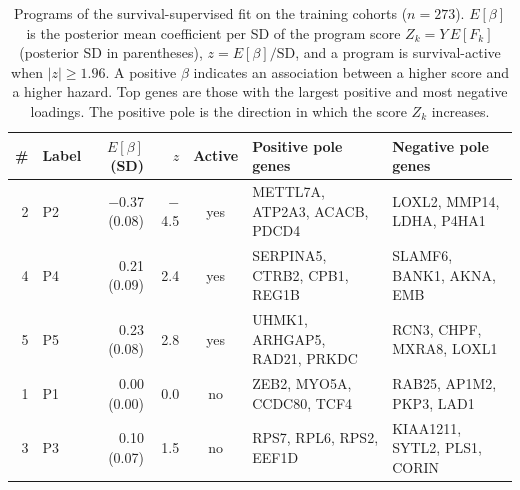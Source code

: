 \begin{table}[tbp]
\centering
\small
\setlength{\tabcolsep}{2.5pt}
\caption{Programs of the survival-supervised fit on the training cohorts ($n=273$). $E[\beta]$ is the posterior mean coefficient per SD of the program score $Z_k = Y\,E[F_k]$ (posterior SD in parentheses), $z = E[\beta]/\mathrm{SD}$, and a program is survival-active when $|z|\ge 1.96$. A positive $\beta$ indicates an association between a higher score and a higher hazard. Top genes are those with the largest positive and most negative loadings. The positive pole is the direction in which the score $Z_k$ increases.}
\label{tab:programs}
\begin{tabular}{@{}r p{1.12in} r r c p{1.3in} p{1.3in}@{}}
\toprule
\# & Label & $E[\beta]$ (SD) & $z$ & Active & Positive pole genes & Negative pole genes \\
\midrule
2 & P2 & $-$0.37 (0.08) & $-$4.5 & yes & METTL7A, ATP2A3, ACACB, PDCD4 & LOXL2, MMP14, LDHA, P4HA1 \\
4 & P4 & 0.21 (0.09) & 2.4 & yes & SERPINA5, CTRB2, CPB1, REG1B & SLAMF6, BANK1, AKNA, EMB \\
5 & P5 & 0.23 (0.08) & 2.8 & yes & UHMK1, ARHGAP5, RAD21, PRKDC & RCN3, CHPF, MXRA8, LOXL1 \\
1 & P1 & 0.00 (0.00) & 0.0 & no & ZEB2, MYO5A, CCDC80, TCF4 & RAB25, AP1M2, PKP3, LAD1 \\
3 & P3 & 0.10 (0.07) & 1.5 & no & RPS7, RPL6, RPS2, EEF1D & KIAA1211, SYTL2, PLS1, CORIN \\
\bottomrule
\end{tabular}
\end{table}
